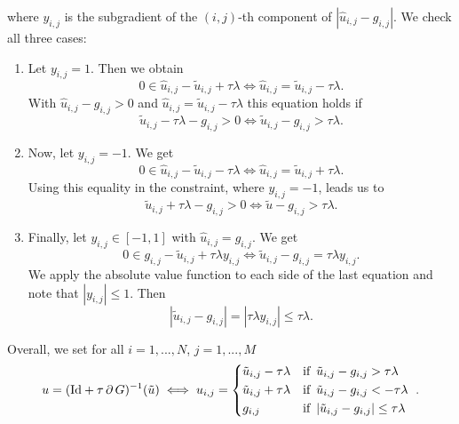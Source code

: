\documentclass[abstracton]{scrreprt}
\begin{document}
            where $y_{i,j}$ is the subgradient of the $(i,j)$-th component of $|\hat{u}_{i,j} - g_{i,j}|$. We check all three cases:
                \begin{enumerate}
                    \item Let $y_{i,j} = 1$. Then we obtain
                        $$
                            0 \in \hat{u}_{i,j} - \tilde{u}_{i,j} + \tau\lambda \iff \hat{u}_{i,j} = \tilde{u}_{i,j} - \tau\lambda.
                        $$
                    With $\hat{u}_{i,j} - g_{i,j} > 0$ and $\hat{u}_{i,j} = \tilde{u}_{i,j} - \tau\lambda$ this equation holds if 
                        $$
                            \tilde{u}_{i,j} - \tau\lambda - g_{i,j} > 0 \iff \tilde{u}_{i,j} - g_{i,j} > \tau\lambda.
                        $$
                    \item Now, let $y_{i,j} = -1$. We get
                        $$
                            0 \in \hat{u}_{i,j} - \tilde{u}_{i,j} - \tau\lambda \iff \hat{u}_{i,j} = \tilde{u}_{i,j} + \tau\lambda.
                        $$
                    Using this equality in the constraint, where $y_{i,j} = -1$, leads us to
                        $$
                            \tilde{u}_{i,j} + \tau\lambda - g_{i,j} > 0 \iff \tilde{u} - g_{i,j} > \tau\lambda.
                        $$
                    \item Finally, let $y_{i,j} \in [-1, 1]$ with $\hat{u}_{i,j} = g_{i,j}$. We get
                        $$
                            0 \in g_{i,j} - \tilde{u}_{i,j} + \tau\lambda y_{i,j} \iff \tilde{u}_{i,j} - g_{i,j} = \tau\lambda y_{i,j}.
                        $$
                    We apply the absolute value function to each side of the last equation and note that $|y_{i,j}| \le 1$. Then
                        $$
                            |\tilde{u}_{i,j} - g_{i,j}| = |\tau\lambda y_{i,j}| \le \tau\lambda.
                        $$
                \end{enumerate}
            Overall, we set for all $i = 1, ..., N$, $j = 1, ..., M$
                \begin{equation}
                    u = (\textnormal{Id} + \tau\,\partial\,G)^{-1}(\tilde{u}) \iff u_{i, j} = 
                        \begin{dcases*}
                            \tilde{u}_{i,j} - \tau\lambda & \textnormal{if\, $\tilde{u}_{i,j} - g_{i,j} > \tau\lambda$} \\
                            \tilde{u}_{i,j} + \tau\lambda & \textnormal{if\, $\tilde{u}_{i,j} - g_{i,j} < - \tau\lambda$} \\
                            g_{i, j} & \textnormal{if\, $|\tilde{u}_{i,j} - g_{i,j}| \le \tau\lambda$}
                        \end{dcases*}.
                \label{eq:prox_g_tvl1}
                \end{equation}
\end{document}
